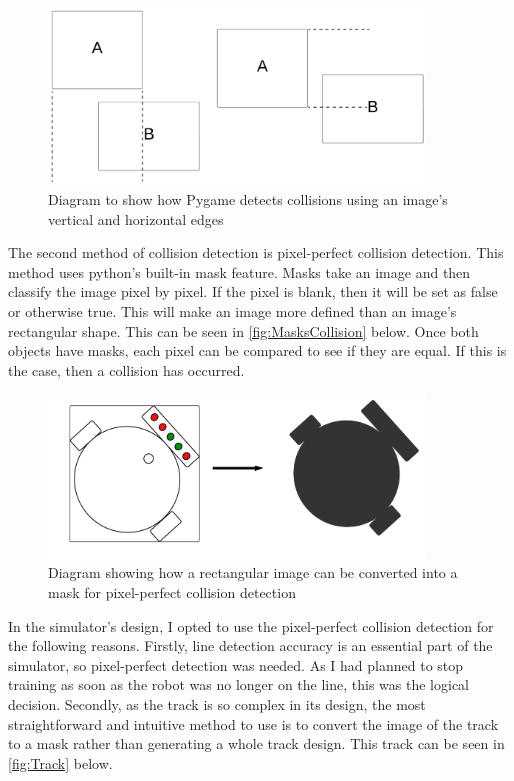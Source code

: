 \documentclass[a4paper,12pt]{article}
\begin{document}
 \begin{figure}[H]
 \centering
 \includegraphics[width=10cm]{imgs/RectCollision.png}
 \caption{Diagram to show how Pygame detects collisions using an image's vertical and horizontal edges}
 \label{fig:RectCollision}
 \end{figure}


The second method of collision detection is pixel-perfect collision detection. This method uses python's built-in mask feature. Masks take an image and then classify the image pixel by pixel. If the pixel is blank, then it will be set as false or otherwise true. This will make an image more defined than an image’s rectangular shape. This can be seen in \autoref{fig:MasksCollision} below. Once both objects have masks, each pixel can be compared to see if they are equal. If this is the case, then a collision has occurred.


 \begin{figure}[H]
 \centering
 \includegraphics[width=10cm]{imgs/MasksCollision.png}
 \caption{Diagram showing how a rectangular image can be converted into a mask for pixel-perfect collision detection}
 \label{fig:MasksCollision}
 \end{figure}

In the simulator's design, I opted to use the pixel-perfect collision detection for the following reasons. Firstly, line detection accuracy is an essential part of the simulator, so pixel-perfect detection was needed. As I had planned to stop training as soon as the robot was no longer on the line, this was the logical decision. Secondly, as the track is so complex in its design, the most straightforward and intuitive method to use is to convert the image of the track to a mask rather than generating a whole track design. This track can be seen in \autoref{fig:Track} below.
\end{document}
